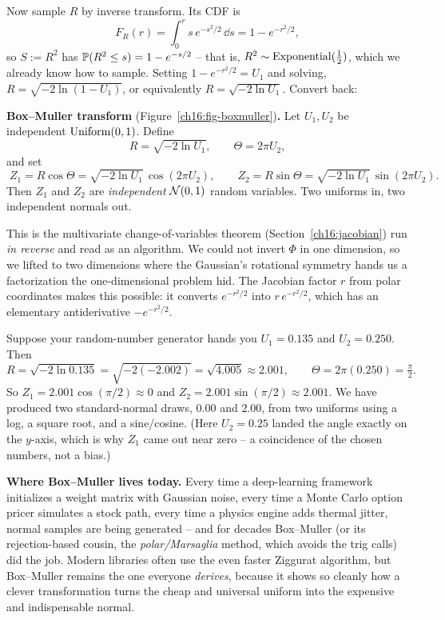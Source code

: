 Now sample $R$ by inverse transform. Its CDF is
\[
  F_R(r) = \int_0^r s\,e^{-s^2/2}\,\dd s = 1 - e^{-r^2/2},
\]
so $S := R^2$ has $\P(R^2 \le s) = 1 - e^{-s/2}$ -- that is, $R^2 \sim \Expo(\tfrac12)$,
which we already know how to sample. Setting $1 - e^{-r^2/2} = U_1$ and solving,
$R = \sqrt{-2\ln(1-U_1)}$, or equivalently $R = \sqrt{-2\ln U_1}$. Convert back:

\begin{formalbox}
\textbf{Box--Muller transform} (Figure~\ref{ch16:fig-boxmuller})\textbf{.} Let $U_1, U_2$ be independent $\Unif(0,1)$. Define
\[
  R = \sqrt{-2\ln U_1}, \qquad \Theta = 2\pi U_2,
\]
and set
\[
  \boxed{\;Z_1 = R\cos\Theta = \sqrt{-2\ln U_1}\,\cos(2\pi U_2), \qquad
          Z_2 = R\sin\Theta = \sqrt{-2\ln U_1}\,\sin(2\pi U_2).\;}
\]
Then $Z_1$ and $Z_2$ are \emph{independent} $\Normal(0,1)$ random variables. Two uniforms
in, two independent normals out.
\end{formalbox}

\begin{happeningbox}
This is the multivariate change-of-variables theorem
(Section~\ref{ch16:jacobian}) run \emph{in reverse} and read as an algorithm. We could not
invert $\Phi$ in one dimension, so we lifted to two dimensions where the Gaussian's
rotational symmetry hands us a factorization the one-dimensional problem hid. The Jacobian
factor $r$ from polar coordinates makes this possible: it converts $e^{-r^2/2}$ into
$r\,e^{-r^2/2}$, which has an elementary antiderivative $-e^{-r^2/2}$.
\end{happeningbox}

\begin{example}
\label{ch16:bm-example}
Suppose your random-number generator hands you $U_1 = 0.135$ and $U_2 = 0.250$. Then
\[
  R = \sqrt{-2\ln 0.135} = \sqrt{-2(-2.002)} = \sqrt{4.005} \approx 2.001,
  \qquad \Theta = 2\pi(0.250) = \tfrac{\pi}{2}.
\]
So $Z_1 = 2.001\cos(\pi/2) \approx 0$ and $Z_2 = 2.001\sin(\pi/2) \approx 2.001$. We have
produced two standard-normal draws, $0.00$ and $2.00$, from two uniforms using a
log, a square root, and a sine/cosine. (Here $U_2 = 0.25$ landed the angle exactly on the
$y$-axis, which is why $Z_1$ came out near zero -- a coincidence of the chosen
numbers, not a bias.)
\end{example}

\begin{applicationbox}
\textbf{Where Box--Muller lives today.} Every time a deep-learning framework initializes a
weight matrix with Gaussian noise, every time a Monte Carlo option pricer simulates a
stock path, every time a physics engine adds thermal jitter, normal samples are being
generated -- and for decades Box--Muller (or its rejection-based cousin, the
\emph{polar/Marsaglia} method, which avoids the trig calls) did the job. Modern libraries
often use the even faster Ziggurat algorithm, but Box--Muller remains the one everyone
\emph{derives}, because it shows so cleanly how a clever transformation turns the cheap and
universal uniform into the expensive and indispensable normal.
\end{applicationbox}

